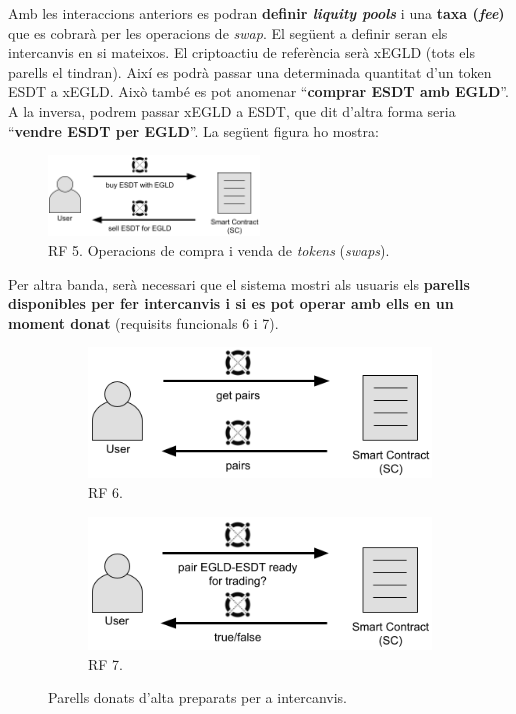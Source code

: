 \documentclass[11pt,a4paper]{article}
\begin{document}
Amb les interaccions anteriors es podran \textbf{definir \textit{liquity pools}} i una \textbf{taxa (\textit{fee})} que es cobrarà per les operacions de \textit{swap}. El següent a definir seran els intercanvis en si mateixos. El criptoactiu de referència serà xEGLD (tots els parells el tindran). Així es podrà passar una determinada quantitat d'un token ESDT a xEGLD. Això també es pot anomenar ``\textbf{comprar ESDT amb EGLD}''. A la inversa, podrem passar xEGLD a ESDT, que dit d'altra forma seria ``\textbf{vendre ESDT per EGLD}''. La següent figura ho mostra:
\begin{figure}[h]
\includegraphics[width=0.5\textwidth]{cu_buy_sell1.png}
\centering
\caption{RF 5. Operacions de compra i venda de \textit{tokens} (\textit{swaps}).}\label{fig:cu_buy_sell1}
\end{figure} 

Per altra banda, serà necessari que el sistema mostri als usuaris els \textbf{parells disponibles per fer intercanvis i si es pot operar amb ells en un moment donat} (requisits funcionals 6 i 7).

\begin{figure}[!htb]
\begin{subfigure}[b]{0.49\textwidth}
  \includegraphics[width=\linewidth]{cu_get_pairs.png}
  \caption{RF 6.}\label{fig:getpairs}
\end{subfigure}\hfill
\begin{subfigure}[b]{0.49\textwidth}
  \includegraphics[width=\linewidth]{cu_status_pair.png}
  \caption{RF 7.}\label{fig:statuspair}
\end{subfigure}\hfill
\caption{Parells donats d'alta preparats per a intercanvis.}
\end{figure}
\end{document}
